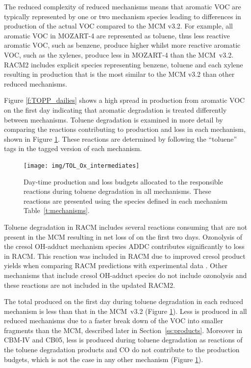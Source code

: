 The reduced complexity of reduced mechanisms means that aromatic VOC are typically represented by one or two mechanism species leading to differences in  production of the actual VOC compared to the MCM v3.2.
For example, all aromatic VOC in MOZART-4 are represented as toluene, thus less reactive aromatic VOC, such as benzene, produce higher  whilst more reactive aromatic VOC, such as the xylenes, produce less  in MOZART-4 than the \mbox{MCM v3.2}.
RACM2 includes explicit species representing benzene, toluene and each xylene resulting in  production that is the most similar to the MCM v3.2 than other reduced mechanisms.

Figure \ref{f:TOPP_dailies} shows a high spread in  production from aromatic VOC on the first day indicating that aromatic degradation is treated differently between mechanisms.
Toluene degradation is examined in more detail by comparing the reactions contributing to  production and loss in each mechanism, shown in Figure \ref{f:toluene_Ox}. 
These reactions are determined by following the ``toluene'' tags in the tagged version of each mechanism.

%
\begin{figure}
    \centering
    \texttt{[image: img/TOL\_Ox\_intermediates]}
    \vspace{0mm}
    \caption{Day-time  production and loss budgets allocated to the responsible reactions during toluene degradation in all mechanisms. These reactions are presented using the species defined in each mechanism \mbox{Table \ref{t:mechanisms}.}}
    \vspace{-4mm}
    \label{f:toluene_Ox}
\end{figure}
%
Toluene degradation in RACM includes several reactions consuming  that are not present in the MCM resulting in net loss of  on the first two days.
Ozonolysis of the cresol OH-adduct mechanism species ADDC contributes significantly to  loss in RACM.
This reaction was included in RACM due to improved cresol product yields when comparing RACM predictions with experimental data \citep{Stockwell:1997}. 
Other mechanisms that include cresol OH-adduct species do not include ozonolysis and these reactions are not included in the updated RACM2.

The total  produced on the first day during toluene degradation in each reduced mechanism is less than that in the \mbox{MCM v3.2} (Figure \ref{f:toluene_Ox}).
Less  is produced in all reduced mechanisms due to a faster break down of the VOC into smaller fragments than the MCM, described later in \mbox{Section \ref{ss:products}}.
Moreover in CBM-IV and CB05, less  is produced during toluene degradation as reactions of the toluene degradation products  and CO do not contribute to the  production budgets, which is not the case in any other mechanism (Figure \ref{f:toluene_Ox}).


